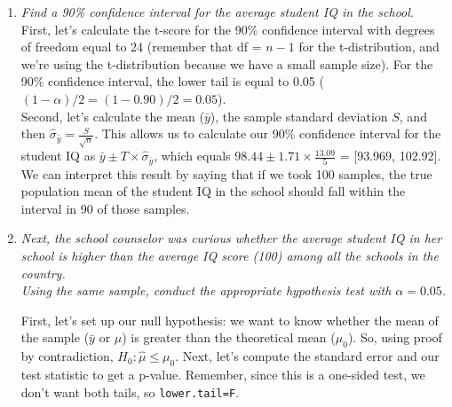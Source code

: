 \documentclass[12pt,letterpaper]{article}
\begin{document}
\begin{enumerate}
	\item \textit{Find a 90\% confidence interval for the average student IQ in the school.}\\
	
	
	\vspace{.15cm}
	\noindent First, let's calculate the t-score for the 90\% confidence interval with degrees of freedom equal to 24 (remember that df = $n-1$ for the t-distribution, and we're using the t-distribution because we have a small sample size). For the 90\% confidence interval, the lower tail is equal to 0.05 ($(1-\alpha)/2 = (1-0.90)/2 = 0.05$).\\
	
	  
	
	\vspace{.15cm}
	\noindent Second, let's calculate the mean ($\bar{y}$),	the sample standard deviation $S$,  and then $\hat{\sigma}_{\bar{y}} = \displaystyle  \frac{S}{\sqrt{n}}$. This allows us to calculate our 90\% confidence interval for the student IQ as $\bar{y} \pm T \times \hat{\sigma}_{\bar{y}}$, which equals $98.44 \pm 1.71 \times \frac{13.09}{5}$ = [93.969, 102.92]. \\
	
	  
	
	\vspace{.15cm}
	\noindent We can interpret this result by saying that if we took 100 samples, the true population mean of the student IQ in the school should fall within the interval in 90 of those samples.\\
	
	\item \textit{Next, the school counselor was curious  whether  the average student IQ in her school is higher than the average IQ score (100) among all the schools in the country.}\\ %
	
	\noindent \textit{Using the same sample, conduct the appropriate hypothesis test with $\alpha=0.05$.}


\vspace{.5cm}

\noindent First, let's set up our null hypothesis: we want to know whether the mean of the sample ($\bar{y}$ or $\hat{\mu}$) is greater than the theoretical mean ($\mu_0$). So, using proof by contradiction, $H_0: \hat{\mu} \leq \mu_0$. Next, let's compute the standard error and our test statistic to get a p-value. Remember, since this is a one-sided test, we don't want both tails, so \texttt{lower.tail=F}.\\



\end{enumerate}
\end{document}
